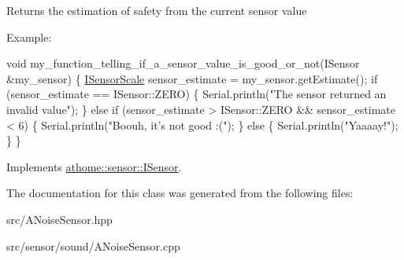 Returns the estimation of safety from the current sensor value

Example\+:


\begin{DoxyCode}
\textcolor{keywordtype}{void} my\_function\_telling\_if\_a\_sensor\_value\_is\_good\_or\_not(ISensor
&my\_sensor) \{ \mbox{\hyperlink{classathome_1_1sensor_1_1_i_sensor_aa70bc27a4c17c86caf96cca776541ddf}{ISensorScale}} sensor\_estimate = my\_sensor.getEstimate(); \textcolor{keywordflow}{if}
(sensor\_estimate == ISensor::ZERO) \{ Serial.println(\textcolor{stringliteral}{"The sensor returned an}
\textcolor{stringliteral}{invalid value"});
  \}
  \textcolor{keywordflow}{else} \textcolor{keywordflow}{if} (sensor\_estimate > ISensor::ZERO && sensor\_estimate < 6) \{
    Serial.println(\textcolor{stringliteral}{"Boouh, it's not good :("});
  \}
  \textcolor{keywordflow}{else} \{
    Serial.println(\textcolor{stringliteral}{"Yaaaay!"});
  \}
\}
\end{DoxyCode}
 

Implements \mbox{\hyperlink{classathome_1_1sensor_1_1_i_sensor_af86df8538fecfcfc670b4adfbbde6abb}{athome\+::sensor\+::\+I\+Sensor}}.



The documentation for this class was generated from the following files\+:\begin{DoxyCompactItemize}
\item 
src/A\+Noise\+Sensor.\+hpp\item 
src/sensor/sound/A\+Noise\+Sensor.\+cpp\end{DoxyCompactItemize}
